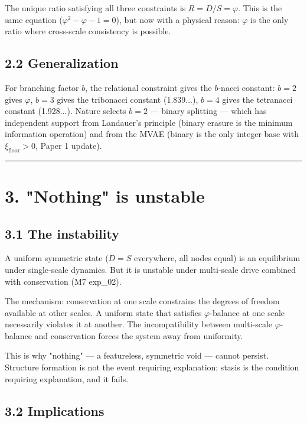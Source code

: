 \documentclass[11pt,a4paper]{article}
\begin{document}
The unique ratio satisfying all three constraints is $R = D/S = \varphi$. This is the same equation ($\varphi^2 - \varphi - 1 = 0$), but now with a physical reason: $\varphi$ is the only ratio where cross-scale consistency is possible.

\subsection*{2.2 Generalization}

For branching factor $b$, the relational constraint gives the $b$-nacci constant: $b = 2$ gives $\varphi$, $b = 3$ gives the tribonacci constant (1.839...), $b = 4$ gives the tetranacci constant (1.928...). Nature selects $b = 2$ — binary splitting — which has independent support from Landauer's principle (binary erasure is the minimum information operation) and from the MVAE (binary is the only integer base with $\xi_{\text{floor}} > 0$, Paper 1 update).

\begin{center}\rule{0.5\linewidth}{0.4pt}\end{center}

\section*{3. "Nothing" is unstable}

\subsection*{3.1 The instability}

A uniform symmetric state ($D = S$ everywhere, all nodes equal) is an equilibrium under single-scale dynamics. But it is unstable under multi-scale drive combined with conservation (M7 exp\_02).

The mechanism: conservation at one scale constrains the degrees of freedom available at other scales. A uniform state that satisfies $\varphi$-balance at one scale necessarily violates it at another. The incompatibility between multi-scale $\varphi$-balance and conservation forces the system away from uniformity.

This is why "nothing" — a featureless, symmetric void — cannot persist. Structure formation is not the event requiring explanation; stasis is the condition requiring explanation, and it fails.

\subsection*{3.2 Implications}
\end{document}
